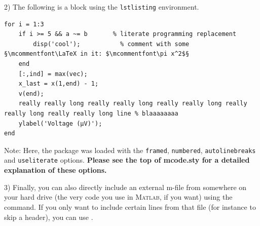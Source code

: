 \documentclass{article}
\begin{document}
2) The following is a block using the \verb|lstlisting| environment.
\begin{lstlisting}
for i = 1:3
	if i >= 5 && a ~= b       % literate programming replacement
		disp('cool');           % comment with some §\mcommentfont\LaTeX in it: $\mcommentfont\pi x^2$§
	end
	[:,ind] = max(vec);
	x_last = x(1,end) - 1;
	v(end);
	really really long really really long really really long really really long really really long line % blaaaaaaaa
	ylabel('Voltage (µV)');
end
\end{lstlisting}
Note: Here, the package was loaded with the \verb|framed|, \verb|numbered|, \verb|autolinebreaks| and \verb|useliterate| options.  \textbf{Please see the top of mcode.sty for a detailed explanation of these options.}


3) Finally, you can also directly include an external m-file from somewhere on your hard drive (the very code you use in \textsc{Matlab}, if you want) using the \verb|| command.  If you only want to include certain lines from that file (for instance to skip a header), you can use \verb||.
\end{document}
